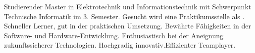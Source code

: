 

\begin{cvparagraph}

Studierender Master in Elektrotechnik und Informationstechnik mit Schwerpunkt Technische Informatik im 3. Semester. Gesucht wird eine Praktikumsstelle als \applicatename. Schneller Lerner, gut in der praktischen Umsetzung. Bewährte Fähigkeiten in der Software- und Hardware-Entwicklung. Enthusiastisch bei der Aneignung zukunftssicherer Technologien. Hochgradig innovativ.Effizienter Teamplayer.
\end{cvparagraph}
